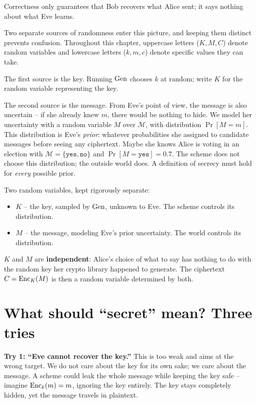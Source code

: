 Correctness only guarantees that Bob recovers what Alice sent; it says nothing about what Eve learns.

Two separate sources of randomness enter this picture, and keeping them distinct prevents confusion. Throughout this chapter, uppercase letters ($K, M, C$) denote random variables and lowercase letters ($k, m, c$) denote specific values they can take.

The first source is the key. Running $\operatorname{Gen}$ chooses $k$ at random; write $K$ for the random variable representing the key.

The second source is the message. From Eve's point of view, the message is also uncertain -- if she already knew $m$, there would be nothing to hide. We model her uncertainty with a random variable $M$ over $\mathcal{M}$, with distribution $\Pr[M = m]$. This distribution is Eve's \emph{prior}: whatever probabilities she assigned to candidate messages before seeing any ciphertext. Maybe she knows Alice is voting in an election with $\mathcal{M} = \{\texttt{yes}, \texttt{no}\}$ and $\Pr[M=\texttt{yes}] = 0.7$. The scheme does not choose this distribution; the outside world does. A definition of secrecy must hold for \emph{every} possible prior.

\begin{focusbox}
Two random variables, kept rigorously separate:
\begin{itemize}
  \item $K$ -- the key, sampled by $\operatorname{Gen}$, unknown to Eve. The scheme controls its distribution.
  \item $M$ -- the message, modeling Eve's prior uncertainty. The world controls its distribution.
\end{itemize}
$K$ and $M$ are \textbf{independent}: Alice's choice of what to say has nothing to do with the random key her crypto library happened to generate. The ciphertext $C = \operatorname{Enc}_K(M)$ is then a random variable determined by both.
\end{focusbox}

\section{What should ``secret'' mean? Three tries}
\label{ch09:three-tries}

\textbf{Try 1: ``Eve cannot recover the key.''} This is too weak and aims at the wrong target. We do not care about the key for its own sake; we care about the message. A scheme could leak the whole message while keeping the key safe -- imagine $\operatorname{Enc}_k(m) = m$, ignoring the key entirely. The key stays completely hidden, yet the message travels in plaintext.

